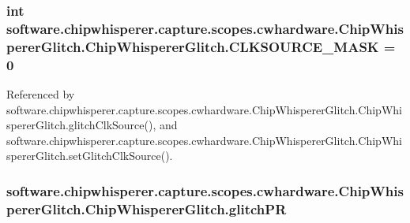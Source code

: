 \subsubsection[{C\+L\+K\+S\+O\+U\+R\+C\+E\+\_\+\+M\+A\+S\+K}]{\setlength{\rightskip}{0pt plus 5cm}int software.\+chipwhisperer.\+capture.\+scopes.\+cwhardware.\+Chip\+Whisperer\+Glitch.\+Chip\+Whisperer\+Glitch.\+C\+L\+K\+S\+O\+U\+R\+C\+E\+\_\+\+M\+A\+S\+K = 0\hspace{0.3cm}{\ttfamily [static]}}\label{classsoftware_1_1chipwhisperer_1_1capture_1_1scopes_1_1cwhardware_1_1ChipWhispererGlitch_1_1ChipWhispererGlitch_a13a1956a55a2ab2f569d3004a8fb8d3c}


Referenced by software.\+chipwhisperer.\+capture.\+scopes.\+cwhardware.\+Chip\+Whisperer\+Glitch.\+Chip\+Whisperer\+Glitch.\+glitch\+Clk\+Source(), and software.\+chipwhisperer.\+capture.\+scopes.\+cwhardware.\+Chip\+Whisperer\+Glitch.\+Chip\+Whisperer\+Glitch.\+set\+Glitch\+Clk\+Source().

\hypertarget{classsoftware_1_1chipwhisperer_1_1capture_1_1scopes_1_1cwhardware_1_1ChipWhispererGlitch_1_1ChipWhispererGlitch_a4eb93174ebf6845b1be3d4378afb212b}{}
\subsubsection[{glitch\+P\+R}]{\setlength{\rightskip}{0pt plus 5cm}software.\+chipwhisperer.\+capture.\+scopes.\+cwhardware.\+Chip\+Whisperer\+Glitch.\+Chip\+Whisperer\+Glitch.\+glitch\+P\+R}\label{classsoftware_1_1chipwhisperer_1_1capture_1_1scopes_1_1cwhardware_1_1ChipWhispererGlitch_1_1ChipWhispererGlitch_a4eb93174ebf6845b1be3d4378afb212b}
\hypertarget{classsoftware_1_1chipwhisperer_1_1capture_1_1scopes_1_1cwhardware_1_1ChipWhispererGlitch_1_1ChipWhispererGlitch_ad102fb22832ef3ea823622bc982d17f7}{}
